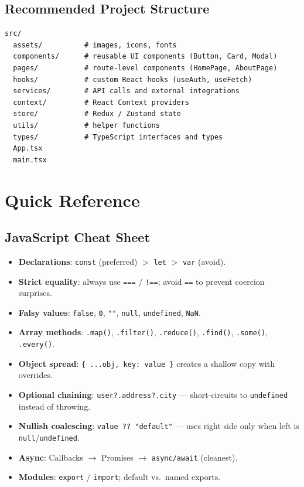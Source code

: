\documentclass[hidelinks]{article}
\begin{document}
\subsection{Recommended Project Structure}
\begin{lstlisting}[language={}, caption={Typical React project layout}]
src/
  assets/          # images, icons, fonts
  components/      # reusable UI components (Button, Card, Modal)
  pages/           # route-level components (HomePage, AboutPage)
  hooks/           # custom React hooks (useAuth, useFetch)
  services/        # API calls and external integrations
  context/         # React Context providers
  store/           # Redux / Zustand state
  utils/           # helper functions
  types/           # TypeScript interfaces and types
  App.tsx
  main.tsx
\end{lstlisting}

\newpage
\section{Quick Reference}

\subsection{JavaScript Cheat Sheet}
\begin{itemize}
  \item \textbf{Declarations}: \texttt{const} (preferred) $>$ \texttt{let} $>$ \texttt{var} (avoid).
  \item \textbf{Strict equality}: always use \texttt{===} / \texttt{!==}; avoid \texttt{==} to prevent coercion surprises.
  \item \textbf{Falsy values}: \texttt{false}, \texttt{0}, \texttt{""}, \texttt{null}, \texttt{undefined}, \texttt{NaN}.
  \item \textbf{Array methods}: \texttt{.map()}, \texttt{.filter()}, \texttt{.reduce()}, \texttt{.find()}, \texttt{.some()}, \texttt{.every()}.
  \item \textbf{Object spread}: \texttt{\{ ...obj, key: value \}} creates a shallow copy with overrides.
  \item \textbf{Optional chaining}: \texttt{user?.address?.city} --- short-circuits to \texttt{undefined} instead of throwing.
  \item \textbf{Nullish coalescing}: \texttt{value ?? "default"} --- uses right side only when left is \texttt{null}/\texttt{undefined}.
  \item \textbf{Async}: Callbacks $\to$ Promises $\to$ \texttt{async/await} (cleanest).
  \item \textbf{Modules}: \texttt{export} / \texttt{import}; default vs.\ named exports.
\end{itemize}
\end{document}
